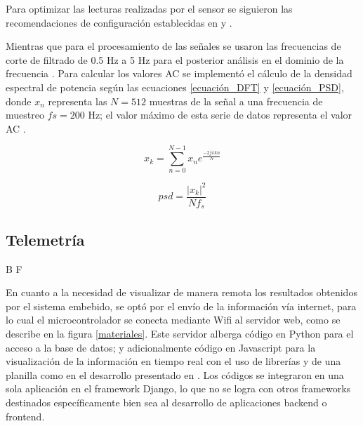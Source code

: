 \documentclass[journal]{IEEEtran}
\begin{document}
Para optimizar las lecturas realizadas por el sensor se siguieron las recomendaciones de configuración establecidas en \cite{E_Recomended_configurations_MAX30102_maxim} y \cite{E_SNR_MAX30102}. {\color{green}Mientras que para el procesamiento de las señales se usaron las frecuencias de corte de filtrado de 0.5 Hz a 5 Hz para el posterior análisis en el dominio de la frecuencia \cite{E_FFT_Spo2}. Para calcular los valores AC se implementó el cálculo de la densidad espectral de potencia según las ecuaciones \ref{ecuación_DFT} y \ref{ecuación_PSD}, donde $x_{n}$ representa las $N=512$ muestras de la señal a una frecuencia de muestreo $fs=200$ Hz; el valor máximo de esta serie de datos representa el valor AC \cite{E_psd_ppg}.


\begin{equation}
	x_{k}=\sum_{n=0}^{N-1}x_{n}e^{\frac{-2j{\pi}kn}{N}}
	\label{ecuación_DFT}
\end{equation}	

\begin{equation}
	psd=\frac{|x_{k}|^2}{Nf_{s}}
	\label{ecuación_PSD}
\end{equation}
	
}

\subsection{Telemetría}

{\color{blue}B F}


En cuanto a la necesidad de visualizar de manera remota los resultados obtenidos por el sistema embebido, se optó por el envío de la información vía internet, para lo cual el microcontrolador se conecta mediante Wifi al servidor web, como se describe en la figura \ref{materiales}. Este servidor  alberga código en Python para el acceso a la base de datos; y adicionalmente código en Javascript para la visualización de la información en tiempo real con el uso de librerías y de una planilla como en el desarrollo presentado en \cite{F_iot_spo2_wrist}. Los códigos se integraron en una sola aplicación en el framework Django, lo que no se logra con otros frameworks destinados específicamente bien sea al desarrollo de aplicaciones backend o frontend.

 
\end{document}
